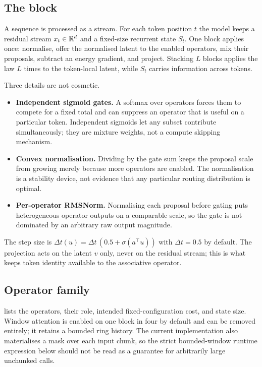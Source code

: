 \subsection{The block}

A sequence is processed as a stream. For each token position $t$ the model keeps a residual
stream $x_t\in\mathbb{R}^{d}$ and a fixed-size recurrent state $S_t$. One block applies
 once: normalise, offer the normalised latent to the enabled operators, mix
their proposals, subtract an energy gradient, and project. Stacking $L$ blocks applies the law
$L$ times to the token-local latent, while $S_t$ carries information across tokens.

Three details are not cosmetic.
\begin{itemize}[leftmargin=1.1em]
\item \textbf{Independent sigmoid gates.} A softmax over operators forces them to compete for
      a fixed total and can suppress an operator that is useful on a particular token. Independent
      sigmoids let any subset contribute simultaneously; they are mixture weights, not a compute
      skipping mechanism.
\item \textbf{Convex normalisation.} Dividing by the gate sum keeps the proposal scale from
      growing merely because more operators are enabled. The normalisation is a stability device,
      not evidence that any particular routing distribution is optimal.
\item \textbf{Per-operator RMSNorm.} Normalising each proposal before gating puts heterogeneous
      operator outputs on a comparable scale, so the gate is not dominated by an arbitrary raw
      output magnitude.
\end{itemize}

The step size is $\Delta t(u)=\Delta t\,(0.5+\sigma(a^\top u))$ with $\Delta t=0.5$ by default.
The projection acts on the latent $v$ only, never on the residual stream; this is what keeps
token identity available to the associative operator.

\subsection{Operator family}

 lists the operators, their role, intended fixed-configuration cost, and
state size. Window attention is enabled on one block in four by default and can be removed
entirely; it retains a bounded ring history. The current implementation also materialises a mask
over each input chunk, so the strict bounded-window runtime expression below should not be read as
a guarantee for arbitrarily large unchunked calls.

